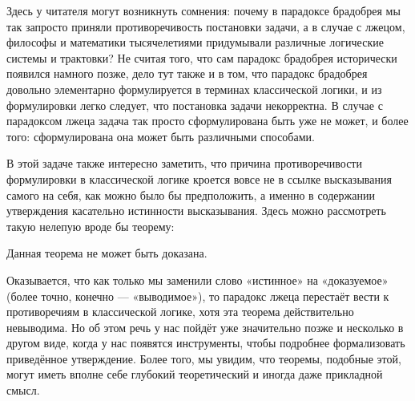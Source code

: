 Здесь у читателя могут возникнуть сомнения: почему в парадоксе брадобрея мы так запросто приняли противоречивость постановки задачи, а в случае с лжецом, философы и математики тысячелетиями придумывали различные логические системы и трактовки? Не считая того, что сам парадокс брадобрея исторически появился намного позже, дело тут также и в том, что парадокс брадобрея довольно элементарно формулируется в терминах классической логики, и из формулировки легко следует, что постановка задачи некорректна. В случае с парадоксом лжеца задача так просто сформулирована быть уже не может, и более того: сформулирована она может быть различными способами.

В этой задаче также интересно заметить, что причина противоречивости формулировки в классической логике кроется вовсе не в ссылке высказывания самого на себя, как можно было бы предположить, а именно в содержании утверждения касательно истинности высказывания. Здесь можно рассмотреть такую нелепую вроде бы теорему:

\begin{thm}Данная теорема не может быть доказана.\end{thm}

Оказывается, что как только мы заменили слово «истинное» на «доказуемое» (более точно, конечно — «выводимое»), то парадокс лжеца перестаёт вести к противоречиям в классической логике, хотя эта теорема действительно невыводима. Но об этом речь у нас пойдёт уже значительно позже и несколько в другом виде, когда у нас появятся инструменты, чтобы подробнее формализовать приведённое утверждение. Более того, мы увидим, что теоремы, подобные этой, могут иметь вполне себе глубокий теоретический и иногда даже прикладной смысл.
